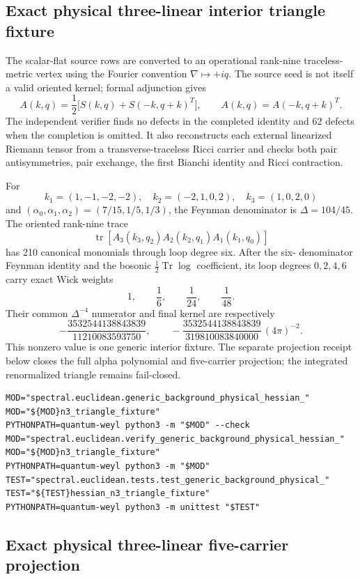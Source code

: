 \documentclass[11pt]{article}
\theoremstyle{definition}
\theoremstyle{remark}
\begin{document}
\subsection{Exact physical three-linear interior triangle fixture}

The scalar-flat source rows are converted to an operational rank-nine
traceless-metric vertex using the Fourier convention
$\nabla\mapsto+iq$.  The source seed is not itself a valid oriented kernel;
formal adjunction gives
\[
 A(k,q)=\frac12\bigl[S(k,q)+S(-k,q+k)^T\bigr],
 \qquad A(k,q)=A(-k,q+k)^T.
\]
The independent verifier finds no defects in the completed identity and 62
defects when the completion is omitted.  It also reconstructs each external
linearized Riemann tensor from a transverse-traceless Ricci carrier and checks
both pair antisymmetries, pair exchange, the first Bianchi identity and Ricci
contraction.

For
\[
 k_1=(1,-1,-2,-2),\quad k_2=(-2,1,0,2),\quad k_3=(1,0,2,0)
\]
and $(\alpha_0,\alpha_1,\alpha_2)=(7/15,1/5,1/3)$, the Feynman denominator is
$\Delta=104/45$.  The oriented rank-nine trace
\[
 \operatorname{tr}[A_3(k_3,q_2)A_2(k_2,q_1)A_1(k_1,q_0)]
\]
has 210 canonical monomials through loop degree six.  After the six-
denominator Feynman identity and the bosonic $\tfrac12\operatorname{Tr}\log$
coefficient, its loop degrees $0,2,4,6$ carry exact Wick weights
\[
 1,\qquad\frac16,\qquad\frac1{24},\qquad\frac1{48}.
\]
Their common $\Delta^{-4}$ numerator and final kernel are respectively
\[
 -\frac{3532544138843839}{11210083593750},\qquad
 -\frac{3532544138843839}{319810083840000}\,(4\pi)^{-2}.
\]
This nonzero value is one generic interior fixture.  The separate projection
receipt below closes the full alpha polynomial and five-carrier projection;
the integrated renormalized triangle remains fail-closed.

\begin{verbatim}
MOD="spectral.euclidean.generic_background_physical_hessian_"
MOD="${MOD}n3_triangle_fixture"
PYTHONPATH=quantum-weyl python3 -m "$MOD" --check
MOD="spectral.euclidean.verify_generic_background_physical_hessian_"
MOD="${MOD}n3_triangle_fixture"
PYTHONPATH=quantum-weyl python3 -m "$MOD"
TEST="spectral.euclidean.tests.test_generic_background_physical_"
TEST="${TEST}hessian_n3_triangle_fixture"
PYTHONPATH=quantum-weyl python3 -m unittest "$TEST"
\end{verbatim}

\subsection{Exact physical three-linear five-carrier projection}
\end{document}
